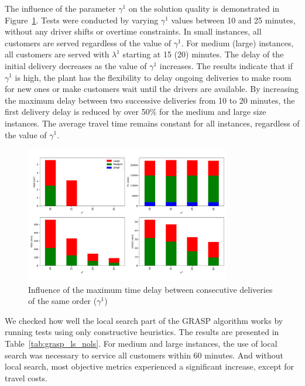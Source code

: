 \documentclass{article}
\begin{document}
The influence of the parameter $\gamma^1$ on the solution quality is demonstrated in Figure~\ref*{fig:gamma1_influence}. Tests were conducted by varying $\gamma^1$ values between 10 and 25 minutes, without any driver shifts or overtime constraints. In small instances, all customers are served regardless of the value of $\gamma^1$. For medium (large) instances, all customers are served with $\lambda^1$ starting at 15 (20) minutes. The delay of the initial delivery decreases as the value of $\gamma^1$ increases. The results indicate that if $\gamma^1$ is high, the plant has the flexibility to delay ongoing deliveries to make room for new ones or make customers wait until the drivers are available. By increasing the maximum delay between two successive deliveries from 10 to 20 minutes, the first delivery delay is reduced by over 50\% for the medium and large size instances. The average travel time remains constant for all instances, regardless of the value of $\gamma^1$.

\begin{figure}[htbp]
    \centering
    \includegraphics[width=0.8\textwidth]{gamma1.pdf} 
    \caption{Influence of the maximum time delay between consecutive deliveries of the same order ($\gamma^1$)}
    \label{fig:gamma1_influence}
\end{figure}

We checked how well the local search part of the GRASP algorithm works by running tests using only constructive heuristics. The results are presented in Table~\ref*{tab:grasp_ls_nols}. For medium and large instances, the use of local search was necessary to service all customers within 60 minutes. And without local search, most objective metrics experienced a significant increase, except for travel costs.
\end{document}

